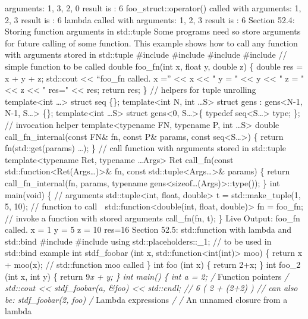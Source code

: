 arguments: 1, 3, 2, 0 result is : 6 foo\_struct::operator() called with
arguments: 1, 2, 3 result is : 6 lambda called with arguments: 1, 2, 3
result is : 6 Section 52.4: Storing function arguments in std::tuple
Some programs need so store arguments for future calling of some
function. This example shows how to call any function with arguments
stored in std::tuple \#include \#include \#include \#include // simple
function to be called double foo\_fn(int x, float y, double z) \{ double
res = x + y + z; std::cout \textless\textless{} ``foo\_fn called. x =''
\textless\textless{} x \textless\textless{} " y = " \textless\textless{}
y \textless\textless{} " z = " \textless\textless{} z
\textless\textless{} " res=" \textless\textless{} res; return res; \} //
helpers for tuple unrolling template\textless int \ldots\textgreater{}
struct seq \{\}; template\textless int N, int \ldots S\textgreater{}
struct gens : gens\textless N-1, N-1, S\ldots\textgreater{} \{\};
template\textless int \ldots S\textgreater{} struct gens\textless0,
S\ldots\textgreater\{ typedef seq\textless S\ldots\textgreater{} type;
\}; // invocation helper template\textless typename FN, typename P, int
\ldots S\textgreater{} double call\_fn\_internal(const FN\& fn, const
P\& params, const seq\textless S\ldots\textgreater) \{ return
fn(std::get(params) \ldots); \} // call function with arguments stored
in std::tuple template\textless typename Ret, typename
\ldots Args\textgreater{} Ret call\_fn(const
std::function\textless Ret(Args\ldots)\textgreater\& fn, const
std::tuple\textless Args\ldots\textgreater\& params) \{ return
call\_fn\_internal(fn, params, typename
gens\textless sizeof\ldots(Args)\textgreater::type()); \} int main(void)
\{ // arguments std::tuple\textless int, float, double\textgreater{} t =
std::make\_tuple(1, 5, 10); // function to call 
std::function\textless double(int, float, double)\textgreater{} fn =
foo\_fn; // invoke a function with stored arguments call\_fn(fn, t); \}
Live Output: foo\_fn called. x = 1 y = 5 z = 10 res=16 Section 52.5:
std::function with lambda and std::bind \#include \#include using
std::placeholders::\_1; // to be used in std::bind example int
stdf\_foobar (int x, std::function\textless int(int)\textgreater{} moo)
\{ return x + moo(x); // std::function moo called \} int foo (int x) \{
return 2+x; \} int foo\_2 (int x, int y) \{ return 9\emph{x + y; \} int
main() \{ int a = 2; /} Function pointers \emph{/ std::cout
\textless\textless{} stdf\_foobar(a, \&foo) \textless\textless{}
std::endl; // 6 ( 2 + (2+2) ) // can also be: stdf\_foobar(2, foo) /}
Lambda expressions \emph{/ /} An unnamed closure from a lambda
